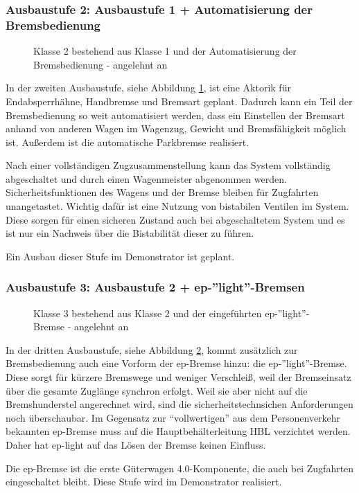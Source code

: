 \subsubsection{Ausbaustufe 2: Ausbaustufe 1 + Automatisierung der Bremsbedienung}
\begin{figure}[htbp] 
    
    \caption{Klasse 2 bestehend aus Klasse 1 und der Automatisierung der Bremsbedienung - angelehnt an \cite{ETR_3}}
    \label{fig:Klasse2}
\end{figure} 
In der zweiten Ausbaustufe, siehe Abbildung \ref{fig:Klasse2}, ist eine Aktorik für Endabsperrhähne, Handbremse und Bremsart geplant. Dadurch kann ein Teil der Bremsbedienung so weit automatisiert werden, dass ein Einstellen der Bremsart anhand von anderen Wagen im \gls{Wagenzug}, Gewicht und Bremsfähigkeit möglich ist. Außerdem ist die automatische Parkbremse realisiert.\par
Nach einer vollständigen Zugzusammenstellung kann das System vollständig abgeschaltet und durch einen Wagenmeister abgenommen werden. Sicherheitsfunktionen des Wagens und der Bremse bleiben für Zugfahrten unangetastet. Wichtig dafür ist eine Nutzung von bistabilen Ventilen im System. Diese sorgen für einen sicheren Zustand auch bei abgeschaltetem System und es ist nur ein Nachweis über die Bistabilität dieser zu führen.\par
Ein Ausbau dieser Stufe im Demonstrator ist geplant.

\subsubsection{Ausbaustufe 3: Ausbaustufe 2 + ep-''light''-Bremsen}
\begin{figure}[htbp] 
    
    \caption{Klasse 3 bestehend aus Klasse 2 und der eingeführten ep-''light''-Bremse - angelehnt an \cite{ETR_3}}
    \label{fig:Klasse3}
\end{figure} 
In der dritten Ausbaustufe, siehe Abbildung \ref{fig:Klasse3}, kommt zusätzlich zur Bremsbedienung auch eine Vorform der \gls{ep-Bremse} hinzu: die ep-''light''-Bremse. Diese sorgt für kürzere Bremswege und weniger Verschleiß, weil der Bremseinsatz über die gesamte Zuglänge synchron erfolgt. Weil sie aber nicht auf die Bremshunderstel angerechnet wird, sind die sicherheitstechnsichen Anforderungen noch überschaubar. Im Gegensatz zur "`vollwertigen"' aus dem Personenverkehr bekannten ep-Bremse muss auf die Hauptbehälterleitung HBL verzichtet werden. Daher hat ep-light auf das Lösen der Bremse keinen Einfluss.\par
Die ep-Bremse ist die erste Güterwagen 4.0-Komponente, die auch bei Zugfahrten eingeschaltet bleibt. Diese Stufe wird im Demonstrator realisiert.

